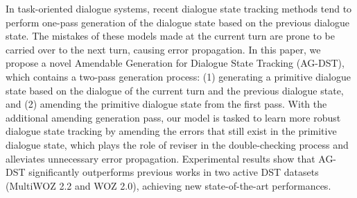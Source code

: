 In task-oriented dialogue systems, recent dialogue state tracking methods tend to perform one-pass generation of the dialogue state based on the previous dialogue state. The mistakes of these models made at the current turn are prone to be carried over to the next turn, causing error propagation. In this paper, we propose a novel Amendable Generation for Dialogue State Tracking (AG-DST), which contains a two-pass generation process: (1) generating a primitive dialogue state based on the dialogue of the current turn and the previous dialogue state, and (2) amending the primitive dialogue state from the first pass. With the additional amending generation pass, our model is tasked to learn more robust dialogue state tracking by amending the errors that still exist in the primitive dialogue state, which plays the role of reviser in the double-checking process and alleviates unnecessary error propagation. Experimental results show that AG-DST significantly outperforms previous works in two active DST datasets (MultiWOZ 2.2 and WOZ 2.0), achieving new state-of-the-art performances.
